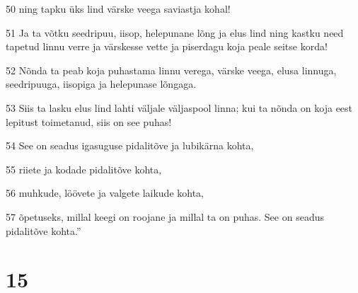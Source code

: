 \par 50 ning tapku üks lind värske veega saviastja kohal!
\par 51 Ja ta võtku seedripuu, iisop, helepunane lõng ja elus lind ning kastku need tapetud linnu verre ja värskesse vette ja piserdagu koja peale seitse korda!
\par 52 Nõnda ta peab koja puhastama linnu verega, värske veega, elusa linnuga, seedripuuga, iisopiga ja helepunase lõngaga.
\par 53 Siis ta lasku elus lind lahti väljale väljaspool linna; kui ta nõnda on koja eest lepitust toimetanud, siis on see puhas!
\par 54 See on seadus igasuguse pidalitõve ja lubikärna kohta,
\par 55 riiete ja kodade pidalitõve kohta,
\par 56 muhkude, löövete ja valgete laikude kohta,
\par 57 õpetuseks, millal keegi on roojane ja millal ta on puhas. See on seadus pidalitõve kohta.”

\chapter{15}

